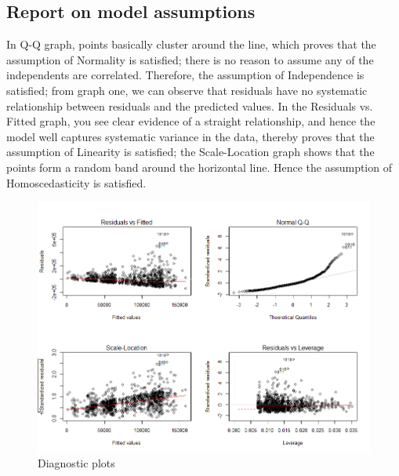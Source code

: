 \documentclass{zjureport}
\begin{document}
\subsection{Report on model assumptions}
In Q-Q graph, points basically cluster around the line, which proves that the assumption of Normality is satisfied; there is no reason to assume any of the independents are correlated. Therefore, the assumption of Independence is satisfied; from graph one, we can observe that residuals have no systematic relationship between residuals and the predicted values. In the Residuals vs. Fitted graph, you see clear evidence of a straight relationship, and hence the model well captures systematic variance in the data, thereby proves that the assumption of Linearity is satisfied; the Scale-Location graph shows that the points form a random band around the horizontal line. Hence the assumption of Homoscedasticity is satisfied. 
\begin{figure}[H]
	\centering
	\includegraphics[width=1\textwidth]{Rplot10.png}
	\caption{Diagnostic plots}
\end{figure}
\end{document}
